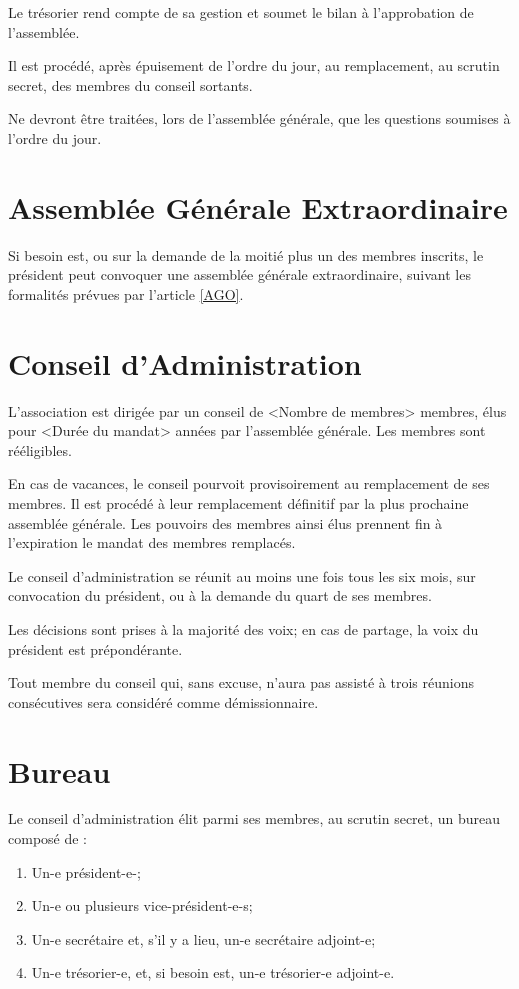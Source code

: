 \documentclass[12pt]{constitution}
\begin{document}
Le trésorier rend compte de sa gestion et soumet le bilan à l’approbation de l’assemblée.

Il est procédé, après épuisement de l’ordre du jour, au remplacement, au scrutin secret, des membres du conseil sortants.

\medskip
Ne devront être traitées, lors de l’assemblée générale, que les questions soumises à l’ordre du jour.

\section{Assemblée Générale Extraordinaire}
Si besoin est, ou sur la demande de la moitié plus un des membres inscrits, le président peut convoquer une assemblée générale extraordinaire, suivant les formalités prévues par l’article \ref{AGO}.

\section{Conseil d'Administration}
L'association est dirigée par un conseil de <Nombre de membres> membres, élus pour <Durée du mandat> années par l'assemblée générale. Les membres sont rééligibles.

En cas de vacances, le conseil pourvoit provisoirement au remplacement de ses membres. Il est procédé à leur remplacement définitif par la plus prochaine assemblée générale. Les pouvoirs des membres ainsi élus prennent fin à l'expiration le mandat des membres remplacés.

\medskip
Le conseil d'administration se réunit au moins une fois tous les six mois, sur convocation du président, ou à la demande du quart de ses membres.

Les décisions sont prises à la majorité des voix; en cas de partage, la voix du président est prépondérante. 

\medskip
Tout membre du conseil qui, sans excuse, n'aura pas assisté à trois réunions consécutives sera considéré comme démissionnaire. 

\section{Bureau}
Le conseil d'administration élit parmi ses membres, au scrutin secret, un bureau composé de :
\begin{enumerate}
	\item Un-e président-e-;
	\item Un-e ou plusieurs vice-président-e-s;
	\item Un-e secrétaire et, s'il y a lieu, un-e secrétaire adjoint-e;
	\item Un-e trésorier-e, et, si besoin est, un-e trésorier-e adjoint-e. 
\end{enumerate}
\end{document}
